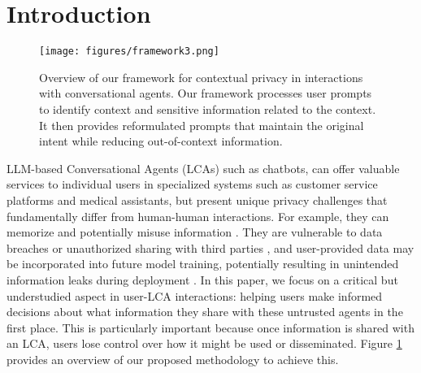 \section{Introduction} %


\begin{figure}[t!]
\centering
    \texttt{[image: figures/framework3.png]}
    \caption{Overview of our framework for contextual privacy  in interactions with conversational agents. Our framework processes user prompts to identify context and sensitive information related to the context. It then provides reformulated prompts that maintain the original intent while reducing out-of-context information.}
    \label{fig:framework}
    \vspace{-9pt}
\end{figure}


LLM-based Conversational Agents (LCAs) such as chatbots, can offer valuable services to individual users \citep{mariani2023artificial,kumar2024medibot, yang2023ai, chow2023developing, rani2024ai, sadhu2024enhancing} in specialized systems such as customer service platforms and medical assistants, but  present unique privacy challenges that fundamentally differ from human-human interactions. For example, they can memorize \citep{carlini2019secret, biderman2024emergent, mccoy2023much, zhang2023counterfactual} and potentially misuse information \citep{kumar2024ethics}. They are vulnerable to data breaches or unauthorized sharing with third parties \citep{nagireddy2024socialstigmaqa,carlini2021extracting, nasr2023scalable}, and user-provided data may be incorporated into future model training, potentially resulting in unintended information leaks during deployment \citep{zanella2020analyzing}. 
In this paper, we focus on a critical but understudied aspect in user-LCA interactions: helping users make informed decisions about what information they share with these untrusted agents in the first place. This is particularly important because once information is shared with an LCA, users lose control over how it might be used or disseminated. Figure \ref{fig:framework} provides an overview of our proposed methodology to achieve this.


